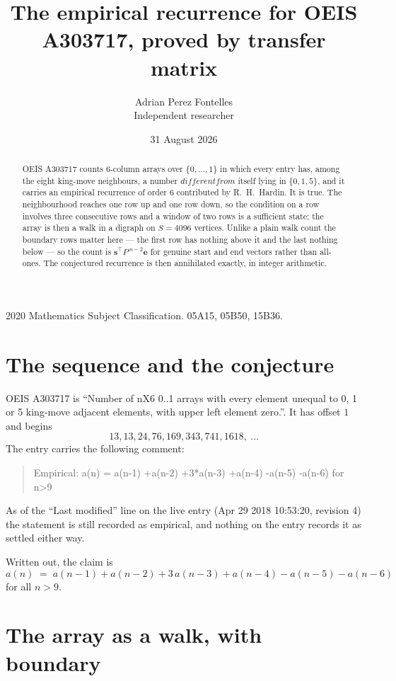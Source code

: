 \documentclass[11pt,a4paper]{article}
\title{The empirical recurrence for OEIS A303717, proved by transfer matrix}
\author{Adrian Perez Fontelles\\ \small Independent researcher}
\date{31 August 2026}
\theoremstyle{plain}
\theoremstyle{definition}
\begin{document}
\maketitle

\begin{abstract}
OEIS A303717 counts $6$-column arrays over $\{0,\dots,1\}$ in which every entry has,
among the eight king-move neighbours, a number $different from$ itself lying in $\{0,1,5\}$, and it carries an empirical
recurrence of order $6$ contributed by R.~H.~Hardin. It is true. The neighbourhood
reaches one row up and one row down, so the condition on a row involves three consecutive
rows and a window of two rows is a sufficient state; the array is then a walk in a digraph
on $S=4096$ vertices. Unlike a plain walk count the boundary rows matter here --- the first
row has nothing above it and the last nothing below --- so the count is
$\mathbf{s}^{\!\top}P^{\,n-2}\mathbf{e}$ for genuine start and end vectors rather than
all-ones. The conjectured recurrence is then annihilated exactly, in integer arithmetic.
\end{abstract}

\noindent\small 2020 Mathematics Subject Classification. 05A15, 05B50, 15B36.\normalsize

\section{The sequence and the conjecture}

OEIS A303717 is ``Number of nX6 0..1 arrays with every element unequal to 0, 1 or 5 king-move adjacent elements, with upper left element zero.''. It has offset
$1$ and begins
\[
13, 13, 24, 76, 169, 343, 741, 1618,\ \dots
\]
The entry carries the following comment:
\begin{quote}\small
Empirical: a(n) = a(n-1) +a(n-2) +3*a(n-3) +a(n-4) -a(n-5) -a(n-6) for n>9
\end{quote}
As of the ``Last modified'' line on the live entry (Apr 29 2018 10:53:20, revision
4) the statement is still recorded as empirical, and nothing on the entry
records it as settled either way.

Written out, the claim is
\begin{equation}\label{eq:conj}
a(n)\;=\;a(n-1) + a(n-2) + 3\,a(n-3) + a(n-4) - a(n-5) - a(n-6)
\end{equation}
for all $n>9$.

\section{The array as a walk, with boundary}
\end{document}
